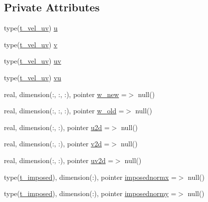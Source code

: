 \subsection*{Private Attributes}
\begin{DoxyCompactItemize}
\item 
type(\mbox{\hyperlink{structmodulehydrodynamic_1_1t__vel__uv}{t\+\_\+vel\+\_\+uv}}) \mbox{\hyperlink{structmodulehydrodynamic_1_1t__velbaroclinic_abcd38addfcddc634031cde620430b7dc}{u}}
\item 
type(\mbox{\hyperlink{structmodulehydrodynamic_1_1t__vel__uv}{t\+\_\+vel\+\_\+uv}}) \mbox{\hyperlink{structmodulehydrodynamic_1_1t__velbaroclinic_a67d77c38c3b6dc3828e920127311dbd0}{v}}
\item 
type(\mbox{\hyperlink{structmodulehydrodynamic_1_1t__vel__uv}{t\+\_\+vel\+\_\+uv}}) \mbox{\hyperlink{structmodulehydrodynamic_1_1t__velbaroclinic_aaa7ebde2d09717f398e615b11475df42}{uv}}
\item 
type(\mbox{\hyperlink{structmodulehydrodynamic_1_1t__vel__uv}{t\+\_\+vel\+\_\+uv}}) \mbox{\hyperlink{structmodulehydrodynamic_1_1t__velbaroclinic_a62547f0d4c7fd8fa3da3d00dea7aa6c4}{vu}}
\item 
real, dimension(\+:, \+:, \+:), pointer \mbox{\hyperlink{structmodulehydrodynamic_1_1t__velbaroclinic_a396f18158b2462e246785900232d9763}{w\+\_\+new}} =$>$ null()
\item 
real, dimension(\+:, \+:, \+:), pointer \mbox{\hyperlink{structmodulehydrodynamic_1_1t__velbaroclinic_a3107d0816ae20159bcd5aeeb70360f6f}{w\+\_\+old}} =$>$ null()
\item 
real, dimension(\+:, \+:), pointer \mbox{\hyperlink{structmodulehydrodynamic_1_1t__velbaroclinic_a91881ce7bc33cc451b1db3da03c40a91}{u2d}} =$>$ null()
\item 
real, dimension(\+:, \+:), pointer \mbox{\hyperlink{structmodulehydrodynamic_1_1t__velbaroclinic_a4f9e97aa88092fb7482c5b89c4ee197d}{v2d}} =$>$ null()
\item 
real, dimension(\+:, \+:), pointer \mbox{\hyperlink{structmodulehydrodynamic_1_1t__velbaroclinic_afd62f89ee5d3a426bb7f4a230e9a1c0a}{uv2d}} =$>$ null()
\item 
type(\mbox{\hyperlink{structmodulehydrodynamic_1_1t__imposed}{t\+\_\+imposed}}), dimension(\+:), pointer \mbox{\hyperlink{structmodulehydrodynamic_1_1t__velbaroclinic_ad7ce272eb3b89f6cd2c3908c1c234064}{imposednormx}} =$>$ null()
\item 
type(\mbox{\hyperlink{structmodulehydrodynamic_1_1t__imposed}{t\+\_\+imposed}}), dimension(\+:), pointer \mbox{\hyperlink{structmodulehydrodynamic_1_1t__velbaroclinic_a1041ffe563d776db8244d150e4b83fc4}{imposednormy}} =$>$ null()

\end{DoxyCompactItemize}
